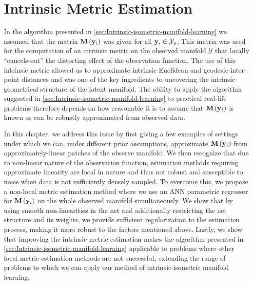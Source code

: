 


	\section{Intrinsic Metric Estimation}
		\label{sec:Intrinsic-Metric-Estimation}

	In the algorithm presented in \cref{sec:Intrinsic-isometric-manifold-learning}
	we assumed that the matrix $\mathbf{M}\left({\bf y}_{i}\right)$ was
	given for all $\text{\ensuremath{\mathbf{y}}}_{i}\in\mathcal{Y}_{s}$.
	This matrix was used for the computation of an intrinsic metric on
	the observed manifold $\mathcal{Y}$ that locally ``cancels-out''
	the distorting effect of the observation function. The use of this
	intrinsic metric allowed us to approximate intrinsic Euclidean and
	geodesic inter-point distances and was one of the key ingredients
	to uncovering the intrinsic geometrical structure of the latent manifold.
	The ability to apply the algorithm suggested in \cref{sec:Intrinsic-isometric-manifold-learning}
	to practical real-life problems therefore depends on how reasonable
	it is to assume that $\mathbf{M}\left({\bf y}_{i}\right)$ is known
	or can be robustly approximated from observed data.
	
	In this chapter, we address this issue by first giving a few examples
	of settings under which we can, under different prior assumptions,
	approximate $\mathbf{M}\left({\bf y}_{i}\right)$ from approximately-linear
	patches of the observe manifold. We then recognize that due to non-linear
	nature of the observation function, estimation methods requiring approximate
	linearity are local in nature and thus not robust and susceptible
	to noise when data is not sufficiently densely sampled. To overcome
	this, we propose a non-local metric estimation method where we use
	an \ac{ANN} parametric regressor for $\mathbf{M}\left({\bf y}_{i}\right)$
	on the whole observed manifold simultaneously. We show that by using
	smooth non-linearities in the net and additionally restricting the
	net structure and its weights, we provide sufficient regularization
	to the estimation process, making it more robust to the factors mentioned
	above. Lastly, we show that improving the intrinsic metric estimation
	makes the algorithm presented in \cref{sec:Intrinsic-isometric-manifold-learning}
	applicable to problems where other local metric estimation methods
	are not successful, extending the range of problems to which we can
	apply our method of intrinsic-isometric manifold learning.
	
